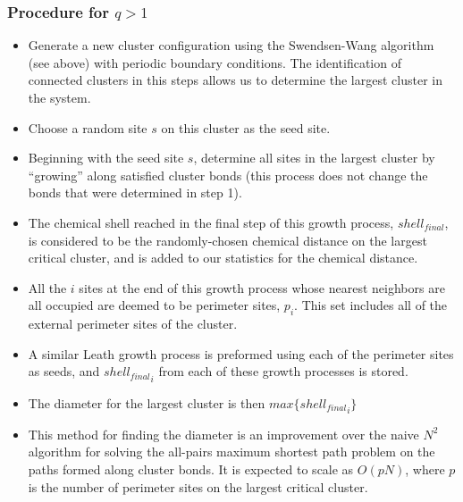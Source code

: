 \documentclass[11pt]{article}
\begin{document}
\subsubsection{Procedure for $q>1$}
\label{sec-5-2-3}
\begin{itemize}

\item Generate a new cluster configuration using the Swendsen-Wang algorithm (see above) with periodic boundary conditions. The identification of connected clusters in this steps allows us to determine the largest cluster in the system.\\
\label{sec-5-2-3-1}%
\item Choose a random site $s$ on this cluster as the seed site.\\
\label{sec-5-2-3-2}%
\item Beginning with the seed site $s$, determine all sites in the largest cluster by ``growing'' along satisfied cluster bonds (this process does not change the bonds that were determined in step 1).\\
\label{sec-5-2-3-3}%
\item The chemical shell reached in the final step of this growth process, $shell_{final}$, is considered to be the randomly-chosen chemical distance on the largest critical cluster, and is added to our statistics for the chemical distance.\\
\label{sec-5-2-3-4}%
\item All the $i$ sites at the end of this growth process whose nearest neighbors are all occupied are deemed to be perimeter sites, $p_i$.  This set includes all of the external perimeter sites of the cluster.\\
\label{sec-5-2-3-5}%
\item A similar Leath growth process is preformed using each of the perimeter sites as seeds, and ${shell_{final}}_i$ from each of these growth processes is stored.\\
\label{sec-5-2-3-6}%
\item The diameter for the largest cluster is then $max\{{shell_{final}}_i\}$\\
\label{sec-5-2-3-7}%
\item This method for finding the diameter is an improvement over the naive $N^2$ algorithm for solving the all-pairs maximum shortest path problem on the paths formed along cluster bonds. It is expected to scale as $O(pN)$, where $p$ is the number of perimeter sites on the largest critical cluster.\\
\label{sec-5-2-3-8}%
\end{itemize} %
\end{document}
